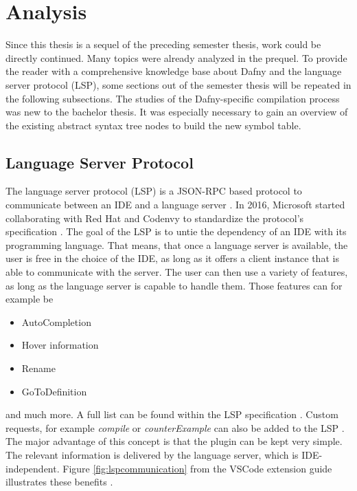 \section{Analysis}
\label{section:analysis}
Since this thesis is a sequel of the preceding semester thesis, work could be directly continued.
Many topics were already analyzed in the prequel.
To provide the reader with a comprehensive knowledge base about Dafny and the language server protocol (LSP), some sections out of the semester thesis will be repeated in the following subsections.
The studies of the Dafny-specific compilation process was new to the bachelor thesis.
It was especially necessary to gain an overview of the existing abstract syntax tree nodes to build the new symbol table.


\subsection{Language Server Protocol}
\label{section:analysis:lsp}
The language server protocol (LSP) is a JSON-RPC based protocol to communicate between an IDE and a language server \cite{lspWiki}.
In 2016, Microsoft started collaborating with Red Hat and Codenvy to standardize the protocol’s specification \cite{lspWiki}.
The goal of the LSP is to untie the dependency of an IDE with its programming language.
That means, that once a language server is available, the user is free in the choice of the IDE, as long as it offers a client instance that is able to communicate with the server.
The user can then use a variety of features, as long as the language server is capable to handle them.
Those features can for example be
\begin{itemize}
    \item AutoCompletion
    \item Hover information
    \item Rename
    \item GoToDefinition
\end{itemize}
and much more. A full list can be found within the LSP specification \cite{lspspec}.
Custom requests, for example \textit{compile} or \textit{counterExample} can also be added to the LSP \cite{lspWiki}.
The major advantage of this concept is that the plugin can be kept very simple.
The relevant information is delivered by the language server, which is IDE-independent.
Figure \ref{fig:lspcommunication} from the VSCode extension guide illustrates these benefits .

